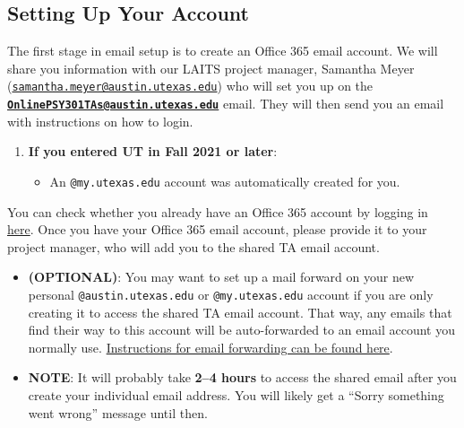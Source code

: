 \documentclass[
]{article}
\providecommand{\tightlist}{%
  \setlength{\itemsep}{0pt}\setlength{\parskip}{0pt}}
\begin{document}
\hypertarget{setting-up-your-account}{%
\subsection{Setting Up Your Account}\label{setting-up-your-account}}

The first stage in email setup is to create an Office 365 email account. We will share you information with our LAITS project manager, Samantha Meyer (\href{mailto:samantha.meyer@austin.utexas.edu}{\nolinkurl{samantha.meyer@austin.utexas.edu}}) who will set you up on the \textbf{\href{mailto:OnlinePSY301TAs@austin.utexas.edu}{\nolinkurl{OnlinePSY301TAs@austin.utexas.edu}}} email. They will then send you an email with instructions on how to login.

\begin{enumerate}
\def\labelenumi{\arabic{enumi}.}
\tightlist
\item
  \textbf{If you entered UT in Fall 2021 or later}:

  \begin{itemize}
  \tightlist
  \item
    An \texttt{@my.utexas.edu} account was automatically created for you.
  \end{itemize}
\end{enumerate}

You can check whether you already have an Office 365 account by logging in \href{https://www.austin.utexas.edu/Office365Management/}{here}. Once you have your Office 365 email account, please provide it to your project manager, who will add you to the shared TA email account.

\begin{itemize}
\tightlist
\item
  \textbf{(OPTIONAL)}: You may want to set up a mail forward on your new personal \texttt{@austin.utexas.edu} or \texttt{@my.utexas.edu} account if you are only creating it to access the shared TA email account. That way, any emails that find their way to this account will be auto-forwarded to an email account you normally use. \href{https://ut.service-now.com/sp?id=kb_article\&number=KB0011657}{Instructions for email forwarding can be found here}.
\item
  \textbf{NOTE}: It will probably take \textbf{2--4 hours} to access the shared email after you create your individual email address. You will likely get a ``Sorry something went wrong'' message until then.
\end{itemize}
\end{document}
